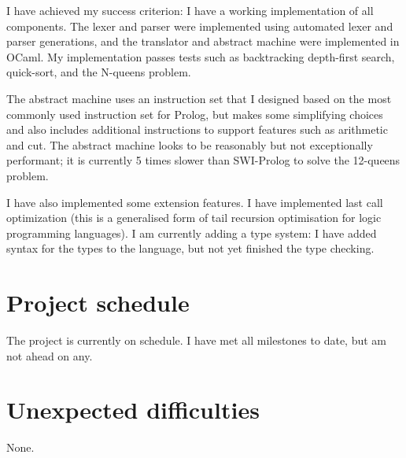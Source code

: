 \documentclass[12pt,a4paper]{report}
\begin{document}
I have achieved my success criterion: I have a working implementation of all components. The lexer and parser were implemented using automated lexer and parser generations, and the translator and abstract machine were implemented in OCaml. My implementation passes tests such as backtracking depth-first search, quick-sort, and the N-queens problem.

The abstract machine uses an instruction set that I designed based on the most commonly used instruction set for Prolog, but makes some simplifying choices and also includes additional instructions to support features such as arithmetic and cut. The abstract machine looks to be reasonably but not exceptionally performant; it is currently 5 times slower than SWI-Prolog to solve the 12-queens problem.

I have also implemented some extension features. I have implemented last call optimization (this is a generalised form of tail recursion optimisation for logic programming languages). I am currently adding a type system: I have added syntax for the types to the language, but not yet finished the type checking.


\section*{Project schedule}

The project is currently on schedule. I have met all milestones to date, but am not ahead on any. 

\section*{Unexpected difficulties}

None.
\end{document}
